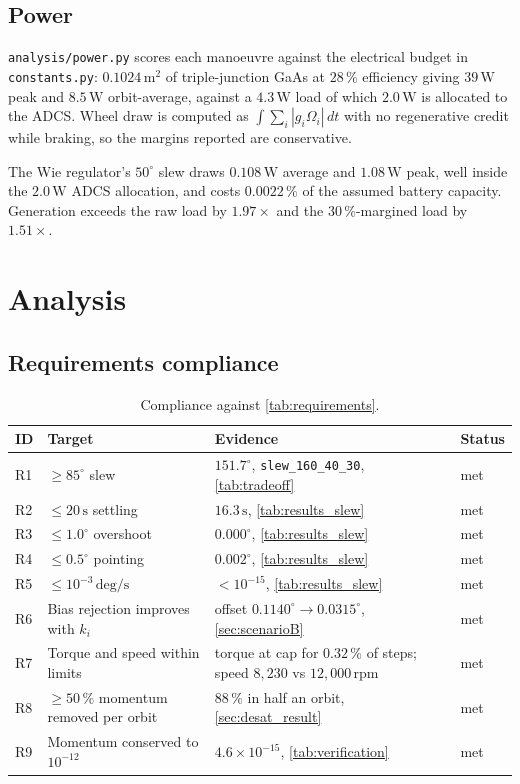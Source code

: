 \documentclass[conference,10pt,a4paper]{IEEEtran}
\newcommand{\unit}[1]{\ensuremath{\,\mathrm{#1}}}
\begin{document}
\subsection{Power}

\texttt{analysis/power.py} scores each manoeuvre against the electrical budget
in \texttt{constants.py}: $0.1024\unit{m^2}$ of triple-junction GaAs at
$28\,\%$ efficiency giving $39\unit{W}$ peak and $8.5\unit{W}$ orbit-average,
against a $4.3\unit{W}$ load of which $2.0\unit{W}$ is allocated to the ADCS.
Wheel draw is computed as $\int\sum_i|g_i\Omega_i|\,dt$ with no regenerative
credit while braking, so the margins reported are conservative.

The Wie regulator's $50^\circ$ slew draws $0.108\unit{W}$ average and
$1.08\unit{W}$ peak, well inside the $2.0\unit{W}$ ADCS allocation, and costs
$0.0022\,\%$ of the assumed battery capacity. Generation exceeds the raw load
by $1.97\times$ and the $30\,\%$-margined load by $1.51\times$.

\section{Analysis}
\label{sec:analysis}

\subsection{Requirements compliance}
\label{sec:compliance}

\begin{table}[!t]
\centering
\caption{Compliance against \cref{tab:requirements}.}
\label{tab:compliance}
\footnotesize
\begin{tabularx}{\textwidth}{@{}llXl@{}}
\toprule
\textbf{ID} & \textbf{Target} & \textbf{Evidence} & \textbf{Status} \\
\midrule
R1 & $\ge85^\circ$ slew          & $151.7^\circ$, \texttt{slew\_160\_40\_30}, \cref{tab:tradeoff} & met \\
R2 & $\le20\unit{s}$ settling    & $16.3\unit{s}$, \cref{tab:results_slew} & met \\
R3 & $\le1.0^\circ$ overshoot    & $0.000^\circ$, \cref{tab:results_slew} & met \\
R4 & $\le0.5^\circ$ pointing     & $0.002^\circ$, \cref{tab:results_slew} & met \\
R5 & $\le10^{-3}\unit{deg/s}$    & $<10^{-15}$, \cref{tab:results_slew} & met \\
R6 & Bias rejection improves with $k_i$ & offset $0.1140^\circ\to0.0315^\circ$, \cref{sec:scenarioB} & met \\
R7 & Torque and speed within limits & torque at cap for $0.32\,\%$ of steps; speed $8{,}230$ vs $12{,}000\unit{rpm}$ & met \\
R8 & $\ge50\,\%$ momentum removed per orbit & $88\,\%$ in half an orbit, \cref{sec:desat_result} & met \\
R9 & Momentum conserved to $10^{-12}$ & $4.6\times10^{-15}$, \cref{tab:verification} & met \\
\bottomrule
\end{tabularx}
\end{table}
\end{document}
